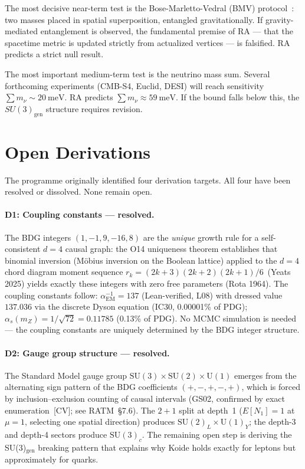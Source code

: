 \documentclass[11pt,a4paper]{article}
\begin{document}
The most decisive near-term test is the Bose-Marletto-Vedral
(BMV) protocol~\citep{Bose2017, Marletto2017}: two masses placed in
spatial superposition, entangled gravitationally. If gravity-mediated
entanglement is observed, the fundamental premise of RA --- that the
spacetime metric is updated strictly from actualized vertices --- is
falsified. RA predicts a strict null result.

The most important medium-term test is the neutrino mass sum.
Several forthcoming experiments (CMB-S4, Euclid, DESI) will reach
sensitivity $\sum m_\nu \sim 20~\mathrm{meV}$. RA predicts
$\sum m_\nu \approx 59~\mathrm{meV}$. If the bound falls below
this, the $SU(3)_{\mathrm{gen}}$ structure requires revision.

\section{Open Derivations}
\label{sec:open}

The programme originally identified four derivation targets. All four
have been resolved or dissolved. None remain open.

\paragraph{D1: Coupling constants --- resolved.}
The BDG integers $(1,-1,9,-16,8)$ are the \emph{unique} growth rule
for a self-consistent $d=4$ causal graph: the O14 uniqueness theorem
establishes that binomial inversion (M\"obius inversion on the Boolean
lattice) applied to the $d=4$ chord diagram moment sequence
$r_k = (2k+3)(2k+2)(2k+1)/6$~(Yeats 2025) yields exactly these
integers with zero free parameters (Rota 1964). The coupling constants
follow: $\alpha_{\mathrm{EM}}^{-1} = 137$ (Lean-verified, L08) with
dressed value $137.036$ via the discrete Dyson equation (IC30, 0.00001\%
of PDG); $\alpha_s(m_Z) = 1/\sqrt{72} = 0.11785$ (0.13\% of PDG).
No MCMC simulation is needed --- the coupling constants are uniquely
determined by the BDG integer structure.

\paragraph{D2: Gauge group structure --- resolved.}
The Standard Model gauge group $\mathrm{SU}(3) \times \mathrm{SU}(2)
\times \mathrm{U}(1)$ emerges from the alternating sign pattern of the
BDG coefficients $(+,-,+,-,+)$, which is forced by inclusion--exclusion
counting of causal intervals (GS02, confirmed by exact
enumeration~[CV]; see RATM~\S7.6). The $2+1$ split at depth~1
($E[N_1]=1$ at $\mu=1$, selecting one spatial direction) produces
$\mathrm{SU}(2)_L \times \mathrm{U}(1)_Y$; the depth-3 and depth-4
sectors produce $\mathrm{SU}(3)_c$. The remaining open step is
deriving the SU(3)$_{\mathrm{gen}}$ breaking pattern that explains why
Koide holds exactly for leptons but approximately for quarks.
\end{document}

